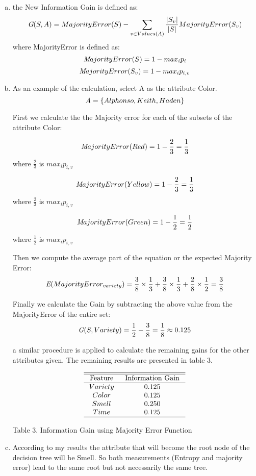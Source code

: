 \documentclass[11pt]{article}
\begin{document}
	\begin{enumerate}[(a)]
		\item  the New Information Gain is defined as: $$\textit G(S,A) = MajorityError(S) - \sum_{v\in Values(A)} \frac{|S_v|}{|S|} MajorityError(S_v)$$ 
		where MajorityError is defined as:
		$$\textit MajorityError(S) = 1 - max_ip_i$$ 
		$$\textit MajorityError(S_v) = 1 - max_ip_{i,v}$$ 
		
		\item As an example of the calculation, select A as the attribute Color.
		$$\textit A = \{Alphonso,Keith,Haden\}$$
		
		First we calculate the the Majority error for each of the subsets of the attribute Color:
		
		$$\textit MajorityError(Red) = 1 - \frac{2}{3} = \frac{1}{3}$$ 
		where  $\frac{2}{3}$ is $max_ip_{i,v}$
		
		$$\textit MajorityError(Yellow) = 1 - \frac{2}{3} = \frac{1}{3}$$ 
		where  $\frac{2}{3}$ is $max_ip_{i,v}$
		
		$$\textit MajorityError(Green) = 1 - \frac{1}{2} = \frac{1}{2}$$ 
		where  $\frac{1}{2}$ is $max_ip_{i,v}$
		
		Then we compute the average part of the equation or the expected Majority Error:
		$$\textit E(MajorityError_{variety}) = \frac{3}{8} \times \frac{1}{3} + \frac{3}{8} \times \frac{1}{3} + \frac{2}{8} \times \frac{1}{2} = \frac{3}{8}$$
		
		Finally we calculate the Gain by subtracting the above value from the MajorityError of the entire set:
		$$\textit G(S,Variety) =  \frac{1}{2} - \frac{3}{8} = \frac{1}{8}  \approx 0.125
		 $$
		
		a similar procedure is applied to calculate the remaining gains for the other attributes given. The remaining results are presented in table 3.
		
		\begin{align}
			\begin{array}{cc}
				\hline \hline \text { Feature } & \text { Information Gain } \\
				\hline 
				Variety & 0.125  \\
				Color & 0.125  \\
				Smell & 0.250  \\
				Time & 0.125  \\
				\hline
			\end{array}
		\end{align}
		
		\begin{center} Table 3. Information Gain using Majority Error Function \end{center}
		\item According to my results the attribute that will become the root node of the decision tree will be Smell. So both measurements  (Entropy and majority error) lead to the same root but not necessarily the same tree.
		\end{enumerate}
\end{document}
